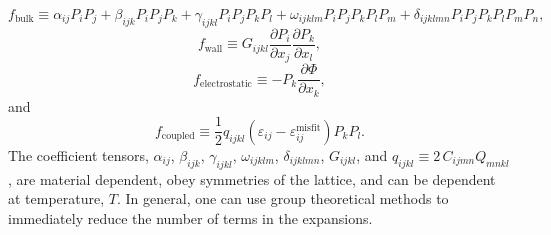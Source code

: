 \documentclass[16pt]{article} %
\begin{document}
%
\begin{equation}\tag{6}
f_\mathrm{bulk} \equiv \alpha_{ij} P_i P_j + \beta_{ijk} P_i P_j P_k + \gamma_{ijkl} P_i P_j P_k P_l + \omega_{ijklm} P_i P_j P_k P_l P_m + \delta_{ijklmn} P_i P_j P_k P_l P_m P_n,
\end{equation}
%
\begin{equation}\tag{7}
f_\mathrm{wall} \equiv  G_{ijkl} \frac{\partial P_i}{\partial x_j} \frac{\partial P_k}{\partial x_l},
\end{equation}
%
\begin{equation}\tag{8}
f_\mathrm{electrostatic} \equiv - P_k \frac{\partial \Phi}{\partial x_k},
\end{equation}
%
and 
%
\begin{equation}\tag{9}
f_\mathrm{coupled} \equiv \frac{1}{2} q_{ijkl} \left(\varepsilon_{ij} - \varepsilon_{ij}^\mathrm{misfit} \right)P_k P_l.
\end{equation}
%
The coefficient tensors, $\alpha_{ij}$, $\beta_{ijk}$, $\gamma_{ijkl}$, $\omega_{ijklm}$, $\delta_{ijklmn}$, $G_{ijkl}$, and $q_{ijkl} \equiv 2 \, C_{ijmn} Q_{mnkl}$, are material dependent, obey symmetries of the lattice, and can be dependent at temperature, $T$.
%
In general, one can use group theoretical methods \cite{WootenBook} to immediately reduce the number of terms in the expansions.
%
\end{document}
